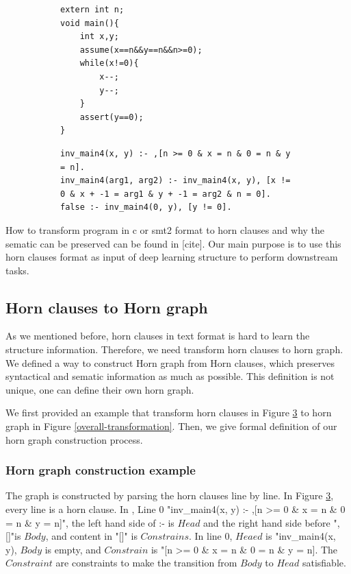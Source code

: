 \documentclass{article}
\begin{document}
\begin{figure}[h]
\begin{subfigure}[b]{0.4\textwidth}
\begin{lstlisting}
extern int n;
void main(){
    int x,y;
    assume(x==n&&y==n&&n>=0);
    while(x!=0){
        x--;
        y--;
    }
    assert(y==0);
}
\end{lstlisting}\label{while-C-program}
\end{subfigure}
\begin{subfigure}[b]{0.6\textwidth}
\begin{lstlisting}
inv_main4(x, y) :- ,[n >= 0 & x = n & 0 = n & y = n].
inv_main4(arg1, arg2) :- inv_main4(x, y), [x != 0 & x + -1 = arg1 & y + -1 = arg2 & n = 0].
false :- inv_main4(0, y), [y != 0].
\end{lstlisting}\label{while-C-horn-clauses}
  \end{subfigure}
  \caption{}
\end{figure}

How to transform program in c or smt2 format to horn clauses and why the sematic can be preserved can be found in [cite]. Our main purpose is to use this horn clauses format as input of deep learning structure to perform downstream tasks.


\subsection{Horn clauses to Horn graph}
As we mentioned before, horn clauses in text format is hard to learn the structure information. Therefore, we need transform horn clauses to horn graph.
We defined a way to construct Horn graph from Horn clauses, which preserves syntactical and sematic information as much as possible. This definition is not unique, one can define their own horn graph.

We first provided an example that transform horn clauses in Figure \ref{while-C-horn-clauses} to horn graph in Figure \ref{overall-transformation}.
Then, we give formal definition of our horn graph construction process.

\subsubsection{Horn graph construction example} \label{Horn-graph-construction-example}
The graph is constructed by parsing the horn clauses line by line. In Figure \ref{while-C-horn-clauses}, every line is a horn clause. In , Line 0 "inv\_main4(x, y) :- ,[n >= 0 \& x = n \& 0 = n \& y = n]", the left hand side of :- is $Head$ and the right hand side before ",[]"is $Body$, and content in "[]" is $Constrains$. In line 0, $Heaed$ is "inv\_main4(x, y), $Body$ is empty, and $Constrain$ is "[n >= 0 \& x = n \& 0 = n \& y = n]. The $Constraint$ are constraints to make the transition from $Body$ to $Head$ satisfiable.
\end{document}
